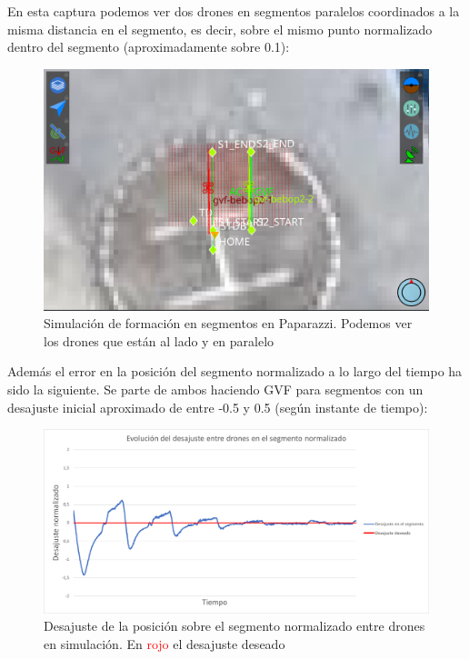 En esta captura podemos ver dos drones en segmentos paralelos coordinados a la misma distancia en el segmento, es decir, sobre el mismo punto normalizado dentro del segmento (aproximadamente sobre 0.1):

\begin{figure}[!h]
    \centering
    \includegraphics[width=\textwidth]{img/fig/fig4.5-segment-formation-sim.png}
    \caption{Simulación de formación en segmentos en Paparazzi. 
    Podemos ver los drones que están al lado y en paralelo}
    \label{fig:segment-formation-simulation}
\end{figure}

Además el error en la posición del segmento normalizado a lo largo del tiempo ha sido la siguiente.
Se parte de ambos haciendo GVF para segmentos con un desajuste inicial aproximado de entre -0.5 y 0.5 (según instante de tiempo):

\begin{figure}[!h]
    \centering
    \includegraphics[width=\textwidth]{img/fig/fig4.6-segment-formation-graph-error.png}
    \caption{Desajuste de la posición sobre el segmento normalizado entre drones en simulación. En \textcolor{red}{rojo} el desajuste deseado}
    \label{fig:segment-formation-graph-error}
\end{figure}

